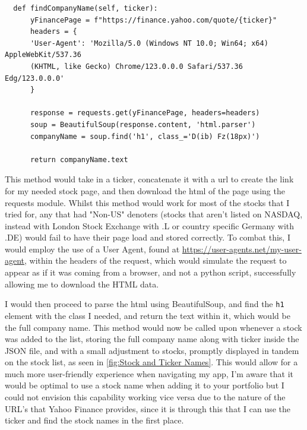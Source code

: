 \documentclass{article}
\begin{document}
\begin{verbatim}
  def findCompanyName(self, ticker):
      yFinancePage = f"https://finance.yahoo.com/quote/{ticker}"
      headers = {
      'User-Agent': 'Mozilla/5.0 (Windows NT 10.0; Win64; x64) AppleWebKit/537.36 
      (KHTML, like Gecko) Chrome/123.0.0.0 Safari/537.36 Edg/123.0.0.0'
      } 

      response = requests.get(yFinancePage, headers=headers)
      soup = BeautifulSoup(response.content, 'html.parser')
      companyName = soup.find('h1', class_='D(ib) Fz(18px)')

      return companyName.text
\end{verbatim}

\vspace{0.3cm}
This method would take in a ticker, concatenate it with a url to create the link for my needed stock page, and then download the html of the page using the requests module. Whilst this method would work for most of the stocks that I tried for, any that had "Non-US" denoters (stocks that aren't listed on NASDAQ, instead with London Stock Exchange with .L or country specific Germany with .DE) would fail to have their page load and stored correctly. To combat this, I would employ the use of a User Agent, found at \url{https://user-agents.net/my-user-agent}, within the headers of the request, which would simulate the request to appear as if it was coming from a browser, and not a python script, successfully allowing me to download the HTML data.\\\vspace{0.3cm}

I would then proceed to parse the html using BeautifulSoup, and find the \texttt{h1} element with the class I needed, and return the text within it, which would be the full company name. This method would now be called upon whenever a stock was added to the list, storing the full company name along with ticker inside the JSON file, and with a small adjustment to stocks, promptly displayed in tandem on the stock list, as seen in \ref{fig:Stock and Ticker Names}. This would allow for a much more user-friendly experience when navigating my app, I'm aware that it would be optimal to use a stock name when adding it to your portfolio but I could not envision this capability working vice versa due to the nature of the URL's that Yahoo Finance provides, since it is through this that I can use the ticker and find the stock names in the first place.\\\vspace{0.3cm} 
\end{document}
